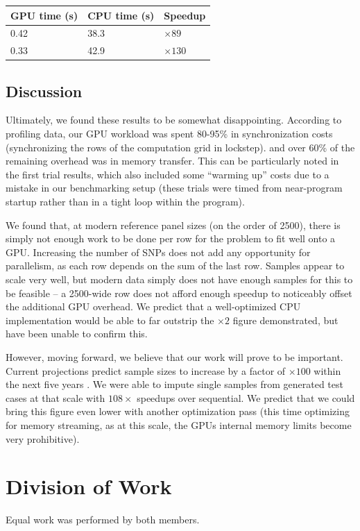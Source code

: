 \documentclass[12pt]{article}
\begin{document}
\begin{table}[!ht]
  \begin{tabular}{ll|l}
    GPU time (s) & CPU time (s) & Speedup \\
    \hline
    0.42 & 38.3 & $\times 89$ \\
    0.33 & 42.9 & $\times 130$ \\
  \end{tabular}
\end{table}

\subsection{Discussion}

Ultimately, we found these results to be somewhat disappointing. According to
profiling data, our GPU workload was spent 80-95\% in synchronization costs
(synchronizing the rows of the computation grid in lockstep). and over 60\% of
the remaining overhead was in memory transfer. This can be particularly noted
in the first trial results, which also included some ``warming up'' costs due
to a mistake in our benchmarking setup (these trials were timed from
near-program startup rather than in a tight loop within the program).

We found that, at modern reference panel sizes (on the order of 2500), there is
simply not enough work to be done per row for the problem to fit well onto a
GPU. Increasing the number of SNPs does not add any opportunity for
parallelism, as each row depends on the sum of the last row. Samples appear to
scale very well, but modern data simply does not have enough samples for this
to be feasible -- a 2500-wide row does not afford enough speedup to noticeably
offset the additional GPU overhead. We predict that a well-optimized CPU
implementation would be able to far outstrip the $\times 2$ figure
demonstrated, but have been unable to confirm this.

However, moving forward, we believe that our work will prove to be important.
Current projections predict sample sizes to increase by a factor of $\times
100$ within the next five years \cite{genomescale}. We were able to impute single samples from
generated test cases at that scale with $108\times$ speedups over sequential.
We predict that we could bring this figure even lower with
another optimization pass (this time optimizing for memory streaming, as at
this scale, the GPUs internal memory limits become very prohibitive).

\section{Division of Work}

Equal work was performed by both members.



\end{document}
